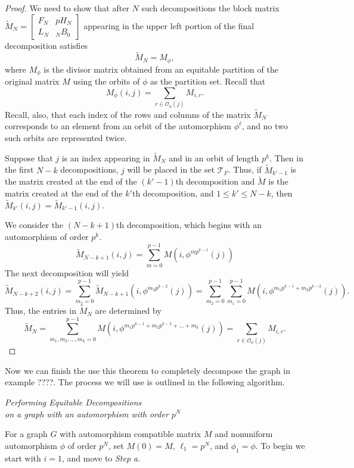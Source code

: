 \documentclass[preprint,12pt]{elsarticle}
\def\m{\medskip}
\newcommand{\cT}{\mathcal{T}}
\newcommand{\tM}{\tilde{M}}
\renewcommand{\so}{\mathscr{O}}
\theoremstyle{definition}
\theoremstyle{remark}
\let\oldmarginpar\marginpar
\renewcommand\marginpar[1]{\oldmarginpar[\raggedleft\footnotesize #1]%
{\raggedright\footnotesize #1}}
\renewcommand{\emph}{\textit}
\newcommand{\dscomm}[1]{\textcolor{OliveGreen}{#1}}
\begin{document}
\begin{proof}
We need to show that  after $N$ such decompositions  the block matrix $\tM_N =  \left[\begin{array}{rr} F_N & pH_N \\ L_N & _NB_0 \end{array}\right]$ appearing in the upper left portion of the final decomposition satisfies
\[
\tM_N = M_\phi,
\]
where $M_\phi$ is the divisor matrix obtained from an equitable partition of the original matrix $M$ using the orbits of $\phi$ as the partition set.
Recall that
\[
M_\phi(i,j) = \sum_{r \in \so_\phi(j)} M_{i,r}.
\]
 Recall, also, that each index of the rows and columns of the matrix $\tM_N$  corresponds to an element from an orbit of the automorphism $\phi^\ell$, and no two such orbits are represented twice.

Suppose that  $j$ is an index appearing in $\tM_N$ and in an orbit of length $p^k$.  Then in the first $N-k$ decompositions, $j$ will be placed in the set $\cT_F$. Thus, if $\tM_{k'-1}$ is the matrix created at the end of the $(k'-1)$th decomposition and $\tilde{M}$ is the matrix created at the end of the $k'$th decomposition, and $1 \leq k' \leq N-k$, then  $\tM_{k'}(i,j) = \tM_{k'-1}(i,j)$.


We consider the $(N-k+1)$th decomposition, which begins with an automorphism of order $p^{k}$.
\[
\tM_{N-k+1}(i,j) =  \sum_{m=0}^{p-1} M(i,\phi^{mp^{k-1}}(j))
 \]
 The next decomposition will yield
 \[
\tM_{N-k+2}(i,j) =  \sum_{m_2=0}^{p-1} \tM_{N-k+1}(i,\phi^{m_2p^{k-2}}(j))= \sum_{m_2=0}^{p-1}\sum_{m_1=0}^{p-1} M(i,\phi^{m_1p^{k-1} + m_2p^{k-2}}(j)).
 \]
Thus, the entries in $\tM_N$ are determined by
\[
\tM_N= \sum_{m_1, m_2, \ldots, m_k  =  0}^{p-1} M(i,\phi^{m_1p^{k-1} + m_2p^{k-2} + \ldots + m_k}(j)) = \sum_{r \in \so_\phi(j)} M_{i,r}.
\]
\marginpar{\dscomm{Add comment about final equality?}}
\end{proof}

 Now we can finish the use this theorem to completely decompose the graph in example ????.  The process we will use is outlined in the following algorithm.
 \\

\begin{center}
\emph{Performing Equitable Decompositions \\on a graph with an automorphism with order $p^N$}
\end{center}

\begingroup\raggedright\leftskip=20pt\rightskip=20pt

For a graph $G$ with automorphism compatible matrix $M$ and nonuniform automorphism $\phi$ of order $p^N$, set $M(0)  = M$, $\ell_1 = p^N$, and $\phi_1 = \phi$. To begin we start with $i = 1$, and move to \emph{Step a.}\m
\end{document}
